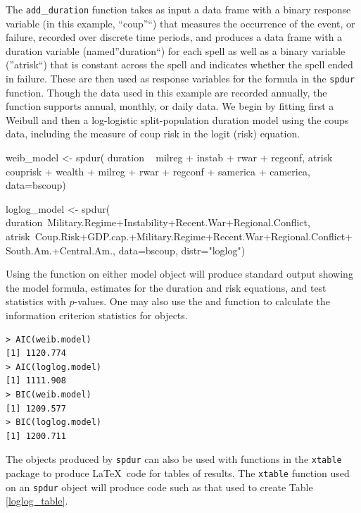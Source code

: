 \documentclass[article]{jss}
\begin{document}
\normalsize
The \texttt{add}\_\texttt{duration} function takes as input a data frame
with a binary response variable (in this example, ``coup''``) that
measures the occurrence of the event, or failure, recorded over discrete
time periods, and produces a data frame with a duration variable
(named''duration``) for each spell as well as a binary variable
(''atrisk``) that is constant across the spell and indicates whether the
spell ended in failure. These are then used as response variables for
the formula in the \texttt{spdur} function. Though the data used in this
example are recorded annually, the function supports annual, monthly, or
daily data. We begin by fitting first a Weibull and then a log-logistic
split-population duration model using the coups data, including the
measure of coup risk in the logit (risk) equation.

\begin{CodeChunk}
\begin{CodeInput}
weib_model <- spdur(
  duration ~ milreg + instab + rwar + regconf,
  atrisk ~ couprisk + wealth + milreg + rwar + regconf + samerica + camerica,
  data=bscoup)

loglog_model <- spdur(
  duration~Military.Regime+Instability+Recent.War+Regional.Conflict,
  atrisk~Coup.Risk+GDP.cap.+Military.Regime+Recent.War+Regional.Conflict+
South.Am.+Central.Am.,
  data=bscoup, distr="loglog")
\end{CodeInput}
\end{CodeChunk}

Using the  function on either model object will produce
standard output showing the model formula, estimates for the duration
and risk equations, and test statistics with \(p\)-values. One may also
use the  and  function to calculate the information
criterion statistics for  objects.\\\small

\begin{verbatim}
> AIC(weib.model)
[1] 1120.774
> AIC(loglog.model)
[1] 1111.908
> BIC(weib.model)
[1] 1209.577
> BIC(loglog.model)
[1] 1200.711
\end{verbatim}

\normalsize
The objects produced by \texttt{spdur} can also be used with functions
in the \texttt{xtable} package to produce \LaTeX~code for tables of
results. The \texttt{xtable} function used on an \texttt{spdur} object
will produce code such as that used to create Table \ref{loglog_table}.
\small
\end{document}
